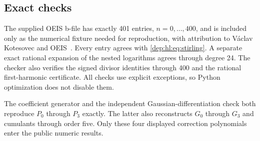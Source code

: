 \documentclass[11pt]{article}
\theoremstyle{definition}\newtheorem{definition}[theorem]{Definition}
\theoremstyle{remark}\newtheorem{remark}[theorem]{Remark}
\begin{document}
\subsection{Exact checks}
The supplied OEIS b-file has exactly 401 entries, $n=0,\ldots,400$,
and is included only as the numerical fixture needed for reproduction,
with attribution to V\'aclav Kotesovec and OEIS~\cite{bfile}.
Every entry agrees with \eqref{dep:hl:eq:stirling}. A separate exact rational
expansion of the nested logarithms agrees through degree 24. The
checker also verifies the signed divisor identities through 400 and
the rational first-harmonic certificate. All checks use explicit
exceptions, so Python optimization does not disable them.

The coefficient generator and the independent Gaussian-differentiation
check both reproduce $P_0$ through $P_3$ exactly. The latter also
reconstructs $G_0$ through $G_3$ and cumulants through order five.
Only these four displayed correction polynomials enter the public
numeric results.
\end{document}

